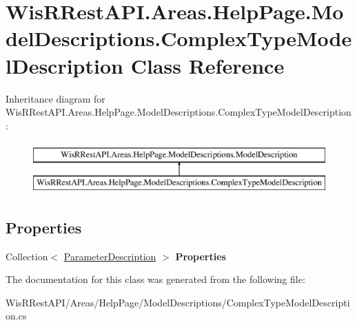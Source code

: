 \hypertarget{class_wis_r_rest_a_p_i_1_1_areas_1_1_help_page_1_1_model_descriptions_1_1_complex_type_model_description}{}\section{Wis\+R\+Rest\+A\+P\+I.\+Areas.\+Help\+Page.\+Model\+Descriptions.\+Complex\+Type\+Model\+Description Class Reference}
\label{class_wis_r_rest_a_p_i_1_1_areas_1_1_help_page_1_1_model_descriptions_1_1_complex_type_model_description}
Inheritance diagram for Wis\+R\+Rest\+A\+P\+I.\+Areas.\+Help\+Page.\+Model\+Descriptions.\+Complex\+Type\+Model\+Description\+:\begin{figure}[H]
\begin{center}
\leavevmode
\includegraphics[height=2.000000cm]{class_wis_r_rest_a_p_i_1_1_areas_1_1_help_page_1_1_model_descriptions_1_1_complex_type_model_description}
\end{center}
\end{figure}
\subsection*{Properties}
\begin{DoxyCompactItemize}
\item 
\hypertarget{class_wis_r_rest_a_p_i_1_1_areas_1_1_help_page_1_1_model_descriptions_1_1_complex_type_model_description_aadd4c8036e8691dedfcc3239bf5292cf}{}Collection$<$ \hyperlink{class_wis_r_rest_a_p_i_1_1_areas_1_1_help_page_1_1_model_descriptions_1_1_parameter_description}{Parameter\+Description} $>$ {\bfseries Properties}\label{class_wis_r_rest_a_p_i_1_1_areas_1_1_help_page_1_1_model_descriptions_1_1_complex_type_model_description_aadd4c8036e8691dedfcc3239bf5292cf}

\end{DoxyCompactItemize}


The documentation for this class was generated from the following file\+:\begin{DoxyCompactItemize}
\item 
Wis\+R\+Rest\+A\+P\+I/\+Areas/\+Help\+Page/\+Model\+Descriptions/Complex\+Type\+Model\+Description.\+cs\end{DoxyCompactItemize}
